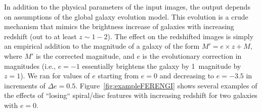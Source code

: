 \documentclass[twocolumn]{aastex6}
\begin{document}

In addition to the physical parameters of the input images, the \ferengi{} output depends on assumptions of the global galaxy evolution model. This evolution is a crude mechanism that mimics the brightness increase of galaxies with increasing redshift (out to at least $z\sim1-2$). The effect on the redshifted images is simply an empirical addition to the magnitude of a galaxy of the form $M' = e\times z + M$, where $M'$ is the corrected magnitude, and $e$ is the evolutionary correction in magnitudes (i.e., $e=-1$ essentially brightens the galaxy by 1~magnitude by $z=1$). We ran \ferengi{} for values of $e$ starting from $e=0$ and decreasing to $e=-3.5$ in increments of $\Delta e = 0.5$. Figure~\ref{fig:exampleFERENGI} shows several examples of the effects of ``losing`` spiral/disc features with increasing redshift for two galaxies with $e=0$. 
\end{document}
